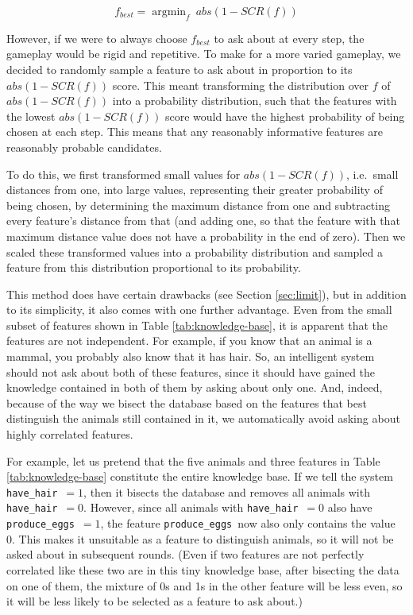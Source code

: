 \documentclass[11pt,a4paper]{article}
\DeclareMathOperator*{\argmin}{argmin}
\newcommand{\havehair}{\texttt{have\_hair}}
\newcommand{\produceeggs}{\texttt{produce\_eggs}}
\begin{document}
\begin{equation}
f_{best} = \argmin_f\ abs(1 - SCR(f)) 
\label{eq:bestfeat}
\end{equation}

However, if we were to always choose $f_{best}$ to ask about at every step, the gameplay would be rigid and repetitive.
To make for a more varied gameplay, we decided to randomly sample a feature to ask about in proportion to its $abs(1 - SCR(f))$ score. 
This meant transforming the distribution over $f$ of $abs(1 - SCR(f))$ into a probability distribution, such that the features with the lowest $abs(1 - SCR(f))$ score would have the highest probability of being chosen at each step.
This means that any reasonably informative features are reasonably probable candidates.

To do this, we first transformed small values for $abs(1 - SCR(f))$, i.e.\ small distances from one, into large values, representing their greater probability of being chosen, by determining the maximum distance from one and subtracting every feature's distance from that (and adding one, so that the feature with that maximum distance value does not have a probability in the end of zero).
Then we scaled these transformed values into a probability distribution and sampled a feature from this distribution proportional to its probability.

This method does have certain drawbacks (see Section \ref{sec:limit}), but in addition to its simplicity, it also comes with one further advantage.
Even from the small subset of features shown in Table \ref{tab:knowledge-base}, it is apparent that the features are not independent.
For example, if you know that an animal is a mammal, you probably also know that it has hair.
So, an intelligent system should not ask about both of these features, since it should have gained the knowledge contained in both of them by asking about only one.
And, indeed, because of the way we bisect the database based on the features that best distinguish the animals still contained in it, we automatically avoid asking about highly correlated features.

For example, let us pretend that the five animals and three features in Table \ref{tab:knowledge-base} constitute the entire knowledge base.
If we tell the system \havehair\ $= 1$, then it bisects the database and removes all animals with \havehair\ $= 0$.
However, since all animals with \havehair\ $= 0$ also have \produceeggs\ $= 1$, the feature \produceeggs\ now also only contains the value 0.
This makes it unsuitable as a feature to distinguish animals, so it will not be asked about in subsequent rounds.
(Even if two features are not perfectly correlated like these two are in this tiny knowledge base, after bisecting the data on one of them, the mixture of 0s and 1s in the other feature will be less even, so it will be less likely to be selected as a feature to ask about.)
\end{document}
